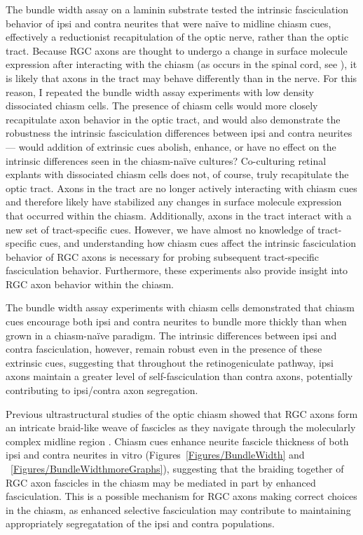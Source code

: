 The bundle width assay on a laminin substrate tested the intrinsic fasciculation behavior of ipsi and contra neurites that were na\"ive to midline chiasm cues, effectively a reductionist recapitulation of the optic nerve, rather than the optic tract.
Because RGC axons are thought to undergo a change in surface molecule expression after interacting with the chiasm (as occurs in the spinal cord, see ), it is likely that axons in the tract may behave differently than in the nerve.
For this reason, I repeated the bundle width assay experiments with low density dissociated chiasm cells.
The presence of chiasm cells would more closely recapitulate axon behavior in the optic tract, and would also demonstrate the robustness the intrinsic fasciculation differences between ipsi and contra neurites --- would addition of extrinsic cues abolish, enhance, or have no effect on the intrinsic differences seen in the chiasm-na\"ive cultures?
Co-culturing retinal explants with dissociated chiasm cells does not, of course, truly recapitulate the optic tract.
Axons in the tract are no longer actively interacting with chiasm cues and therefore likely have stabilized any changes in surface molecule expression that occurred within the chiasm. 
Additionally, axons in the tract interact with a new set of tract-specific cues.
However, we have almost no knowledge of tract-specific cues, and understanding how chiasm cues affect the intrinsic fasciculation behavior of RGC axons is necessary for probing subsequent tract-specific fasciculation behavior.
Furthermore, these experiments also provide insight into RGC axon behavior within the chiasm.

The bundle width assay experiments with chiasm cells demonstrated that chiasm cues encourage both ipsi and contra neurites to bundle more thickly than when grown in a chiasm-na\"ive paradigm.
The intrinsic differences between ipsi and contra fasciculation, however, remain robust even in the presence of these extrinsic cues, suggesting that throughout the retinogeniculate pathway, ipsi axons maintain a greater level of self-fasciculation than contra axons, potentially contributing to ipsi/contra axon segregation.

Previous ultrastructural studies of the optic chiasm showed that RGC axons form an intricate braid-like weave of fascicles as they navigate through the molecularly complex midline region \cite{colello1998changing}.
Chiasm cues enhance neurite fascicle thickness of both ipsi and contra neurites in vitro (Figures~\ref{Figures/BundleWidth} and ~\ref{Figures/BundleWidthmoreGraphs}), suggesting that the braiding together of RGC axon fascicles in the chiasm may be mediated in part by enhanced fasciculation.
This is a possible mechanism for RGC axons making correct choices in the chiasm, as enhanced selective fasciculation may contribute to maintaining appropriately segregatation of the ipsi and contra populations.

